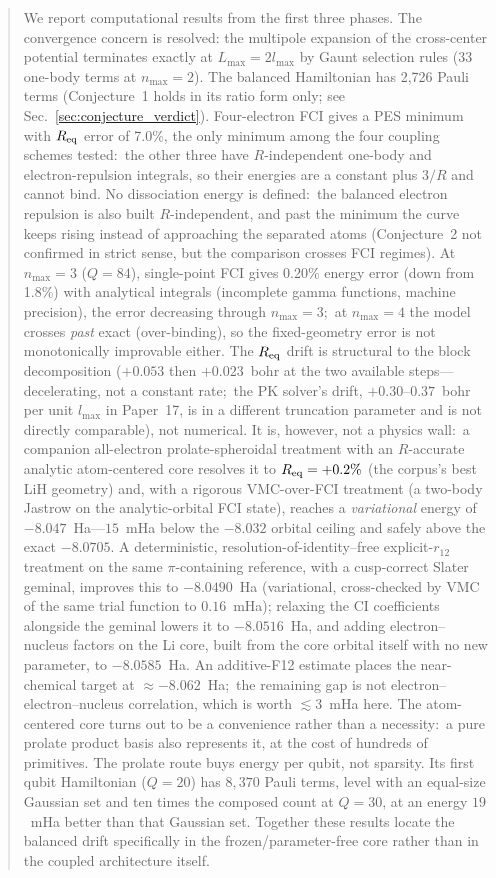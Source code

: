 \documentclass[aps,pra,twocolumn,superscriptaddress,longbibliography]{revtex4-2}
\begin{document}
\begin{abstract}
We report computational results from the first three phases.  The
convergence concern is resolved: the multipole expansion of the
cross-center potential terminates exactly at $L_{\max} = 2l_{\max}$
by Gaunt selection rules (33 one-body terms at $n_{\max}=2$).  The
balanced Hamiltonian has 2{,}726 Pauli terms (Conjecture~1 holds in
its ratio form only; see Sec.~\ref{sec:conjecture_verdict}).
Four-electron FCI gives a PES minimum with $R_{\rm eq}$ error of 7.0\%,
the only minimum among the four coupling schemes tested:\ the other three
have $R$-independent one-body and electron-repulsion integrals, so their
energies are a constant plus $3/R$ and cannot bind.  No dissociation
energy is defined:\ the balanced electron repulsion is also built
$R$-independent, and past the minimum the curve keeps rising instead of
approaching the separated atoms (Conjecture~2 not confirmed in strict sense,
but the comparison crosses FCI regimes).  At $n_{\max} = 3$ ($Q = 84$),
single-point FCI gives 0.20\% energy error (down from 1.8\%) with
analytical integrals (incomplete gamma functions, machine precision),
the error decreasing through $n_{\max}=3$;\ at $n_{\max}=4$ the
model crosses \emph{past} exact (over-binding), so the fixed-geometry
error is not monotonically improvable either.  The $R_{\rm eq}$ drift is structural to the
block decomposition ($+0.053$ then $+0.023$~bohr at the two available steps---
decelerating, not a constant rate;\ the PK solver's drift, $+0.30$--$0.37$~bohr
per unit $l_{\max}$ in Paper~17, is in a different truncation parameter and is not
directly comparable), not numerical.  It is,
however, not a physics wall:\ a companion all-electron prolate-spheroidal
treatment with an $R$-accurate analytic atom-centered core resolves it to
$R_{\rm eq} = +0.2\%$ (the corpus's best LiH geometry) and, with a rigorous
VMC-over-FCI treatment (a two-body Jastrow on the analytic-orbital FCI state),
reaches a \emph{variational} energy of $-8.047$~Ha---$15$~mHa below the $-8.032$
orbital ceiling and safely above the exact $-8.0705$.  A deterministic,
resolution-of-identity--free explicit-$r_{12}$ treatment on the same
$\pi$-containing reference, with a cusp-correct Slater geminal, improves this to
$-8.0490$~Ha (variational, cross-checked by VMC of the same trial function to
$0.16$~mHa); relaxing the CI coefficients alongside the geminal lowers it to
$-8.0516$~Ha, and adding electron--nucleus factors on the Li core, built from the
core orbital itself with no new parameter, to $-8.0585$~Ha.  An additive-F12 estimate places the near-chemical target at
$\approx-8.062$~Ha;\ the remaining gap is not electron--electron--nucleus
correlation, which is worth $\lesssim3$~mHa here.  The atom-centered core
turns out to be a convenience rather than a necessity:\ a pure prolate product
basis also represents it, at the cost of hundreds of primitives.  The prolate
route buys energy per qubit, not sparsity.  Its first qubit Hamiltonian ($Q=20$)
has $8{,}370$ Pauli terms, level with an equal-size Gaussian set and ten times
the composed count at $Q=30$, at an energy $19$~mHa better than that Gaussian set.  Together these results locate the balanced drift specifically in the
frozen/parameter-free core rather than in the coupled architecture itself.
\end{abstract}
\end{document}
